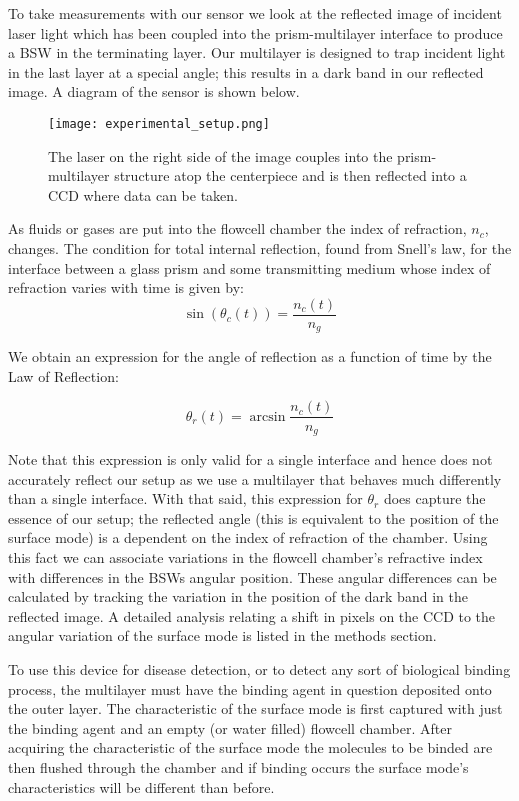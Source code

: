 \begin{flushleft}
	\hspace{0.25in}
	To take measurements with our sensor we look at the reflected image of incident laser light which has been coupled into the prism-multilayer interface to produce a BSW in the terminating layer. Our multilayer is designed to trap incident light in the last layer at a special angle; this results in a dark band in our reflected image. A diagram of the sensor is shown below.

	\begin{figure}[h]
		\begin{center}
			\texttt{[image: experimental\_setup.png]}
			\caption{The laser on the right side of the image couples into the prism-multilayer structure atop the centerpiece and is then reflected into a CCD where data can be taken.}
			\label{fig:SETUP}
		\end{center}
	\end{figure}

	As fluids or gases are put into the flowcell chamber the index of refraction, $n_c$, changes. The condition for total internal reflection, found from Snell's law, for the interface between a glass prism and some transmitting medium whose index of refraction varies with time is given by:
	\[
		\sin\left({\theta_c(t)}\right) = \frac{n_c(t)}{n_g}
	\]

	We obtain an expression for the angle of reflection as a function of time by the Law of Reflection:

	\[
		\theta_r(t) = \arcsin{\frac{n_c(t)}{n_g}}
	\]

	Note that this expression is only valid for a single interface and hence does not accurately reflect our setup as we use a multilayer that behaves much differently than a single interface. With that said, this expression for $\theta_r$ does capture the essence of our setup; the reflected angle (this is equivalent to the position of the surface mode) is a dependent on the index of refraction of the chamber. Using this fact we can associate variations in the flowcell chamber's refractive index with differences in the BSWs angular position. These angular differences can be calculated by tracking the variation in the position of the dark band in the reflected image. A detailed analysis relating a shift in pixels on the CCD to the angular variation of the surface mode is listed in the methods section.

	\hspace{0.25in}
	To use this device for disease detection, or to detect any sort of biological binding process, the multilayer must have the binding agent in question deposited onto the outer layer. The characteristic of the surface mode is first captured with just the binding agent and an empty (or water filled) flowcell chamber. After acquiring the characteristic of the surface mode the molecules to be binded are then flushed through the chamber and if binding occurs the surface mode's characteristics will be different than before.
	\pagestyle{empty}
\end{flushleft}
